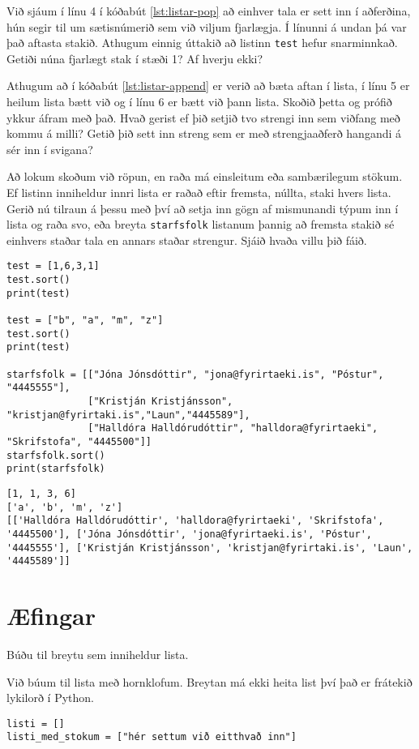 Við sjáum í línu 4 í kóðabút \ref{lst:listar-pop} að einhver tala er sett inn í aðferðina, hún segir til um sætisnúmerið sem við viljum fjarlægja.
Í línunni á undan þá var það aftasta stakið.
Athugum einnig úttakið að listinn \texttt{test} hefur snarminnkað.
Getiði núna fjarlægt stak í stæði 1?
Af hverju ekki?

Athugum að í kóðabút \ref{lst:listar-append} er verið að bæta aftan í lista, í línu 5 er heilum lista bætt við og í línu 6 er bætt við þann lista.
Skoðið þetta og prófið ykkur áfram með það.
Hvað gerist ef þið setjið tvo strengi inn sem viðfang með kommu á milli?
Getið þið sett inn streng sem er með strengjaaðferð hangandi á sér inn í svigana?

Að lokum skoðum við röpun, en raða má einsleitum eða sambærilegum stökum.
Ef listinn inniheldur innri lista er raðað eftir fremsta, núllta, staki hvers lista.
Gerið nú tilraun á þessu með því að setja inn gögn af mismunandi týpum inn í lista og raða svo, eða breyta \texttt{starfsfolk} listanum þannig að fremsta stakið sé einhvers staðar tala en annars staðar strengur.
Sjáið hvaða villu þið fáið.

\begin{lstlisting}[caption=.sort() aðferðin, label=lst:listar-sort]
test = [1,6,3,1]
test.sort()
print(test)

test = ["b", "a", "m", "z"]
test.sort()
print(test)

starfsfolk = [["Jóna Jónsdóttir", "jona@fyrirtaeki.is", "Póstur", "4445555"],
			  ["Kristján Kristjánsson", "kristjan@fyrirtaki.is","Laun","4445589"],
			  ["Halldóra Halldórudóttir", "halldora@fyrirtaeki", "Skrifstofa", "4445500"]]
starfsfolk.sort()
print(starfsfolk)
\end{lstlisting}
\lstset{style=uttak}
\begin{lstlisting}
[1, 1, 3, 6]
['a', 'b', 'm', 'z']
[['Halldóra Halldórudóttir', 'halldora@fyrirtaeki', 'Skrifstofa', '4445500'], ['Jóna Jónsdóttir', 'jona@fyrirtaeki.is', 'Póstur', '4445555'], ['Kristján Kristjánsson', 'kristjan@fyrirtaki.is', 'Laun', '4445589']]
\end{lstlisting}
\lstset{style=venjulegt}

\newpage
\section{Æfingar}
\begin{exercise}\label{lst1}
	Búðu til breytu sem inniheldur lista.
\end{exercise}
\begin{Answer}[ref={lst1}]
Við búum til lista með hornklofum.
Breytan má ekki heita list því það er frátekið lykilorð í Python.
\begin{lstlisting}
listi = []
listi_med_stokum = ["hér settum við eitthvað inn"]\end{lstlisting}
\end{Answer}

